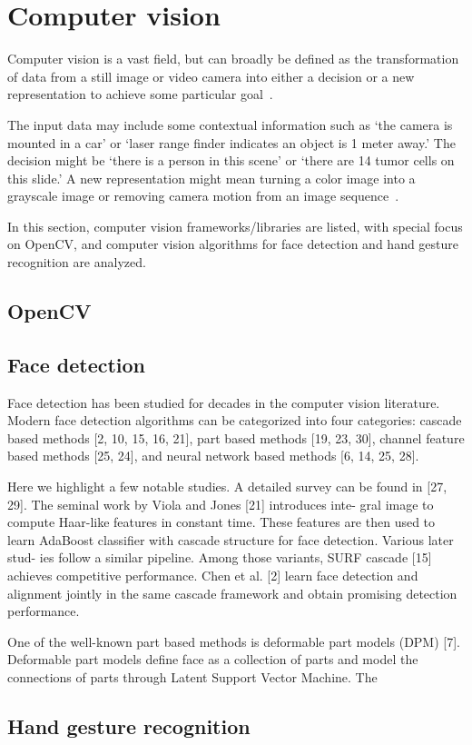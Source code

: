 %
\section{Computer vision}
\label{sec:computer-vision}
Computer vision is a vast field, but can broadly be defined as the
transformation of data from a still image or video camera into
either a decision or a new representation to achieve some particular goal~\cite{kaehler2016learning}.

The input data may include some contextual information
such as `the camera is mounted in a car' or `laser range finder indicates an
object is 1 meter away.'
The decision might be `there is a person in this scene' or `there are 14
tumor cells on this slide.'
A new representation might mean turning a color image
into a grayscale image or removing camera motion from an image
sequence~\cite{kaehler2016learning}.

In this section, computer vision frameworks/libraries are listed, with special
focus on OpenCV, and computer vision algorithms for face detection and hand
gesture recognition are analyzed.
%
\subsection{OpenCV}
\label{sec:opencv}

\subsection{Face detection}
\label{sec:face-detection}
Face detection has been studied for decades in the computer
vision literature. Modern face detection algorithms can
be categorized into four categories:
cascade based methods [2, 10, 15, 16, 21],
part based methods [19, 23, 30], channel feature based methods [25, 24], and
neural network based methods [6, 14, 25, 28].

Here we highlight a few notable studies.
A detailed survey can be found in [27, 29].
The seminal work by Viola and Jones [21] introduces inte-
gral image to compute Haar-like features in constant time.
These features are then used to learn AdaBoost classifier
with cascade structure for face detection. Various later stud-
ies follow a similar pipeline. Among those variants, SURF
cascade [15] achieves competitive performance. Chen et al. [2] learn face
detection and alignment jointly in the same cascade framework and obtain promising detection performance.

One of the well-known part based methods is deformable
part models (DPM) [7]. Deformable part models define
face as a collection of parts and model the connections
of parts through Latent Support Vector Machine. The

\subsection{Hand gesture recognition}
\label{sec:hand-gest-recogn}



